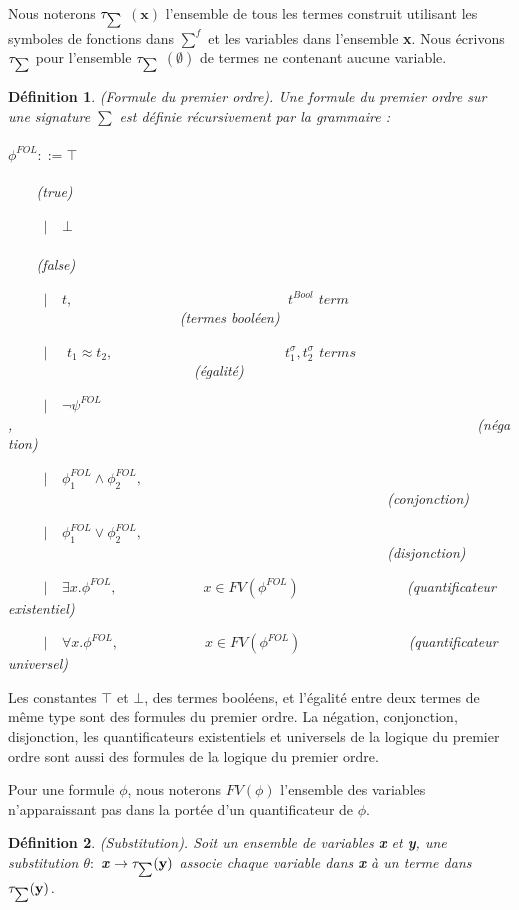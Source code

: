 \documentclass[9pt,openany]{book}
\newcommand\smallsum{\mathsmaller\sum}
\newtheorem{definition}{D\'efinition}[section]
\begin{document}
Nous noterons $\tau_{\mathsmaller\sum}$ $(\textbf{x})$ l'ensemble de tous les termes construit utilisant les symboles de fonctions dans $\sum^{f}$ et les variables dans l'ensemble \textbf{x}. Nous \'ecrivons $\tau_{\mathsmaller\sum}$ pour l'ensemble $\tau_{\mathsmaller\sum}$ $(\emptyset)$ de termes ne contenant aucune variable.
\begin{definition} 
(Formule du premier ordre). Une formule du premier ordre sur une signature $\sum$ est d\'efinie r\'ecursivement par la grammaire :\\
\\$\phi^{FOL} ::= \top$~~~~~~~~~~~~~~~~~~~~~~~~~~~~~~~~~~~~~~~~~~~~~~~~~~~~~~~~~~~~~~~~~~~~~~~~~~(true)\par
~~~~~$|$~~$\bot$~~~~~~~~~~~~~~~~~~~~~~~~~~~~~~~~~~~~~~~~~~~~~~~~~~~~~~~~~~~~~~~~~~~~~~~~~~(false)
\par
~~~~~$|$~~$t,$~~~~~~~~~~~~~~~~~~~~~~~~~~~~~~$t^{Bool}$ $term$~~~~~~~~~~~~~~~~~~~~~~~~(termes bool\'een)\par
~~~~~$|$~~ $t_{1} \approx t_{2},$~~~~~~~~~~~~~~~~~~~~~~~~$t_{1}^{\sigma},t_{2}^{\sigma}$ $terms$~~~~~~~~~~~~~~~~~~~~~~~~~~(\'egalit\'e)\par
~~~~~$|$~~$\neg\psi^{FOL}$,~~~~~~~~~~~~~~~~~~~~~~~~~~~~~~~~~~~~~~~~~~~~~~~~~~~~~~~~~~~~~~~~~(n\'egation)\par
~~~~~$|$~~$\phi_{1}^{FOL} \land \phi_{2}^{FOL},$~~~~~~~~~~~~~~~~~~~~~~~~~~~~~~~~~~~~~~~~~~~~~~~~~~~~~(conjonction)\par
~~~~~$|$~~$\phi_{1}^{FOL} \lor \phi_{2}^{FOL},$~~~~~~~~~~~~~~~~~~~~~~~~~~~~~~~~~~~~~~~~~~~~~~~~~~~~~(disjonction)\par
~~~~~$|$~~$\exists x.\phi^{FOL},$~~~~~~~~~~~~$x\in FV(\phi^{FOL})$~~~~~~~~~~~~~~~(quantificateur existentiel)\par
~~~~~$|$~~$\forall x.\phi^{FOL},$~~~~~~~~~~~~$x\in FV(\phi^{FOL})$~~~~~~~~~~~~~~~(quantificateur universel)
\end{definition}
Les constantes $\top$ et $\bot$, des termes bool\'eens, et l'\'egalit\'e entre deux termes de m\^eme type sont des formules du premier ordre. La n\'egation, conjonction, disjonction, les quantificateurs existentiels et universels de la logique du premier ordre sont aussi des formules de la logique du premier ordre.\par
	Pour une formule $\phi$, nous noterons $FV(\phi)$ l'ensemble des variables n'apparaissant pas dans la port\'ee d'un quantificateur de $\phi$.

\begin{definition}
(Substitution). Soit un ensemble de variables \textbf{x} et \textbf{y}, une substitution $\theta :$ \textbf{x} $\rightarrow \tau_{\smallsum}(\textbf{y})$ associe chaque variable dans \textbf{x} \`a un terme dans $\tau_{\mathsmaller\sum}(\textbf{y})$.
\end{definition}
\end{document}
